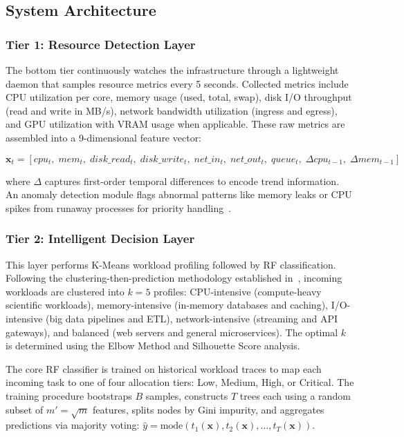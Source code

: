 \documentclass[conference]{IEEEtran}
\begin{document}
\subsection{System Architecture}

\subsubsection{Tier 1: Resource Detection Layer}
The bottom tier continuously watches the infrastructure through a lightweight daemon that samples resource metrics every 5 seconds. Collected metrics include CPU utilization per core, memory usage (used, total, swap), disk I/O throughput (read and write in MB/s), network bandwidth utilization (ingress and egress), and GPU utilization with VRAM usage when applicable. These raw metrics are assembled into a 9-dimensional feature vector:

$$\mathbf{x}_t = [cpu_t,\; mem_t,\; disk\_read_t,\; disk\_write_t,\; net\_in_t,\; net\_out_t,\; queue_t,\; \Delta cpu_{t-1},\; \Delta mem_{t-1}]$$

where $\Delta$ captures first-order temporal differences to encode trend information. An anomaly detection module flags abnormal patterns like memory leaks or CPU spikes from runaway processes for priority handling~\cite{Ref6}.

\subsubsection{Tier 2: Intelligent Decision Layer}
This layer performs K-Means workload profiling followed by RF classification. Following the clustering-then-prediction methodology established in~\cite{Ref1}, incoming workloads are clustered into $k = 5$ profiles: CPU-intensive (compute-heavy scientific workloads), memory-intensive (in-memory databases and caching), I/O-intensive (big data pipelines and ETL), network-intensive (streaming and API gateways), and balanced (web servers and general microservices). The optimal $k$ is determined using the Elbow Method and Silhouette Score analysis.

The core RF classifier is trained on historical workload traces to map each incoming task to one of four allocation tiers: Low, Medium, High, or Critical. The training procedure bootstraps $B$ samples, constructs $T$ trees each using a random subset of $m' = \sqrt{m}$ features, splits nodes by Gini impurity, and aggregates predictions via majority voting: $\hat{y} = \text{mode}(t_1(\mathbf{x}), t_2(\mathbf{x}), \ldots, t_T(\mathbf{x}))$.
\end{document}
